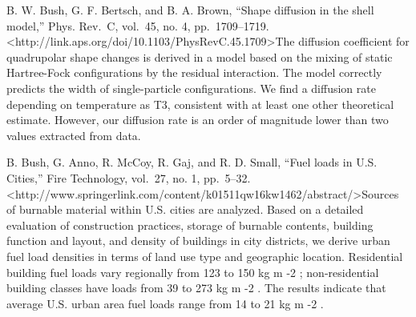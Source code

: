\documentclass[]{article}
\begin{document}
B. W. Bush, G. F. Bertsch, and B. A. Brown, ``Shape diffusion in the
shell model,'' Phys. Rev.~C, vol.~45, no. 4, pp.~1709--1719.
\textless{}http://link.aps.org/doi/10.1103/PhysRevC.45.1709\textgreater{}The
diffusion coefficient for quadrupolar shape changes is derived in a
model based on the mixing of static Hartree-Fock configurations by the
residual interaction. The model correctly predicts the width of
single-particle configurations. We find a diffusion rate depending on
temperature as T3, consistent with at least one other theoretical
estimate. However, our diffusion rate is an order of magnitude lower
than two values extracted from data.

B. Bush, G. Anno, R. McCoy, R. Gaj, and R. D. Small, ``Fuel loads in
U.S. Cities,'' Fire Technology, vol.~27, no. 1, pp.~5--32.
\textless{}http://www.springerlink.com/content/k01511qw16kw1462/abstract/\textgreater{}Sources
of burnable material within U.S. cities are analyzed. Based on a
detailed evaluation of construction practices, storage of burnable
contents, building function and layout, and density of buildings in city
districts, we derive urban fuel load densities in terms of land use type
and geographic location. Residential building fuel loads vary regionally
from 123 to 150 kg m -2 ; non-residential building classes have loads
from 39 to 273 kg m -2 . The results indicate that average U.S. urban
area fuel loads range from 14 to 21 kg m -2 .
\end{document}

